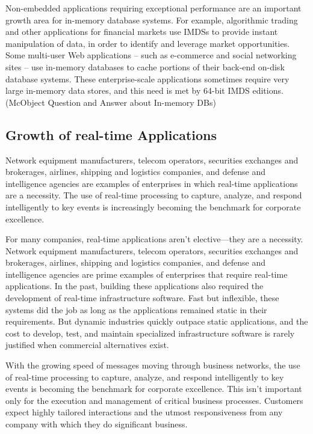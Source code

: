 \documentclass[12pt]{article} %
\begin{document}
Non-embedded applications requiring exceptional performance are an important growth area for in-memory database systems. For example, algorithmic trading and other applications for financial markets use IMDSs to provide instant manipulation of data, in order to identify and leverage market opportunities. Some multi-user Web applications – such as e-commerce and social networking sites – use in-memory databases to cache portions of their back-end on-disk database systems. These enterprise-scale applications sometimes require very large in-memory data stores, and this need is met by 64-bit IMDS editions.(McObject Question and Answer about In-memory DBs)

\subsection{Growth of real-time Applications}

Network equipment manufacturers, telecom operators, securities exchanges and brokerages, airlines, shipping and logistics companies, and defense and intelligence agencies are examples of enterprises in which real-time applications are a necessity. The use of real-time processing to capture, analyze, and respond intelligently to key events is increasingly becoming the benchmark for corporate excellence.

For many companies, real-time applications aren’t elective—they are a necessity. Network equipment manufacturers, telecom operators, securities exchanges and brokerages, airlines, shipping and logistics companies, and defense and intelligence agencies are prime examples of enterprises that require real-time applications. In the past, building these applications also required the development of real-time infrastructure software. Fast but inflexible, these systems did the job as long as the applications remained static in their requirements. But dynamic industries quickly outpace static applications, and the cost to develop, test, and maintain  specialized infrastructure software is rarely justified when commercial alternatives exist.

With the growing speed of messages moving through business networks, the use of real-time processing to capture, analyze, and respond intelligently to key events is becoming the benchmark for corporate excellence. This isn’t important only for the execution and management of critical business processes. Customers expect highly tailored interactions and the utmost responsiveness from any company with which they do significant business.\\
\end{document}
